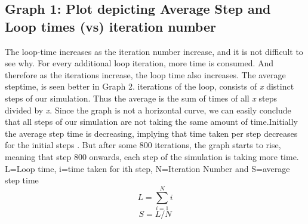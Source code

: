 \documentclass[11pt]{article}
\begin{document}
\subsection*{Graph 1: Plot depicting Average Step and Loop times (vs) iteration number}
The loop-time increases as the iteration number increase, and it is not difficult to see why. For every additional loop iteration, more time is consumed. And therefore as the iterations increase, the loop time also increases.
\newline The average steptime, is seen better in Graph 2.  iterations of the loop, consists of {\it x} distinct steps of our simulation.
Thus the average is the sum of times of all {\it x} steps divided by {\it x}. Since the graph is not a horizontal curve, we can 
easily conclude that all steps of our simulation are not taking the same amount of time.Initially the average step time is decreasing, implying that time taken per step decreases for the initial steps . But after some 800 iterations, the graph starts to rise, meaning that step 800 onwards, each step of the simulation is taking more time.
\newline\newline L=Loop time, i=time taken for ith step, N=Iteration Number and S=average step time
\begin{equation}
L=\displaystyle\sum\limits_{i=1}^N i
\end{equation}
\begin{equation}
S=L/N
\end{equation}
\end{document}
